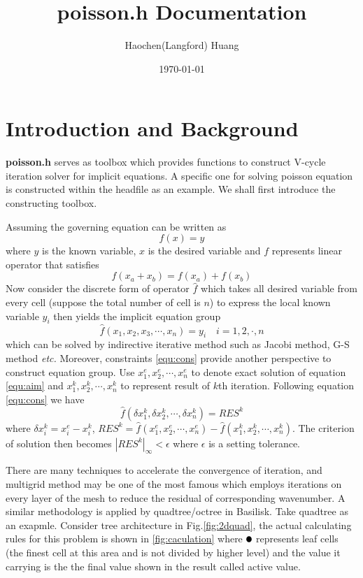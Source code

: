 \documentclass[a4paper]{article}
\title{poisson.h Documentation}
\author{Haochen(Langford) Huang}
\date{\today}
\newcommand{\activetest}{\tikz \fill[black] (3pt,3pt) circle (3pt);}
\begin{document}
\maketitle

\section{Introduction and Background}\label{sec:intro}
\textbf{poisson.h} serves as toolbox which provides functions to construct V-cycle iteration solver for implicit equations. A specific one for solving poisson equation is constructed within the headfile as an example. We shall first introduce the constructing toolbox.\par
Assuming the governing equation can be written as
\begin{equation}
  f( x) = y
\end{equation}
where $y$ is the known variable, $ x$ is the desired variable and $f$ represents linear operator that satisfies
\begin{equation}\label{equ:cons}
  f( x_a+ x_b) = f( x_a) + f( x_b)
\end{equation}
Now consider the discrete form of operator $\hat{f}$ which takes all desired variable from every cell (suppose the total number of cell is $n$) to express the local known variable $y_i$ then yields the implicit equation group
\begin{equation}\label{equ:aim}
  \hat{f}(x_1,x_2,x_3,\cdots,x_n) = y_i \quad i = 1,2,\cdot,n
\end{equation}
which can be solved by indirective iterative method such as Jacobi method, G-S method\cite{moin2010fundamentals} \emph{etc.} Moreover, constraints \ref{equ:cons} provide another perspective to construct equation group. Use $x_1^e,x_2^e,\cdots,x_n^e$ to denote exact solution of equation \ref{equ:aim} and $x_1^k,x_2^k,\cdots,x_n^k$ to represent result of $k$th iteration. Following equation \ref{equ:cons} we have
\begin{equation}\label{equ:iter}
  \hat{f}(\delta x_1^k,\delta x_2^k,\cdots, \delta x_n^k) = RES^k
\end{equation}
where $\delta x_i^k = x_i^e - x_i^k$, $RES^k = \hat{f}(x_1^e,x_2^e,\cdots,x_n^e) - \hat{f}(x_1^k,x_2^k,\cdots,x_n^k)$. The criterion of solution then becomes $|RES^k|_{\infty}<\epsilon$ where $\epsilon$ is a setting tolerance.\par
There are many techniques to accelerate the convergence of iteration, and multigrid method\cite{wesseling1995introduction} may be one of the most famous which employs iterations on every layer of the mesh to reduce the residual of corresponding wavenumber. A similar methodology is applied by quadtree/octree in Basilisk. Take quadtree as an exapmle. Consider tree architecture in Fig.\ref{fig:2dquad}, the actual calculating rules for this problem is shown in \ref{fig:caculation} where $\activetest$ represents leaf cells (the finest cell at this area and is not divided by higher level) and the value it carrying is the the final value shown in the result called active value.
\end{document}
